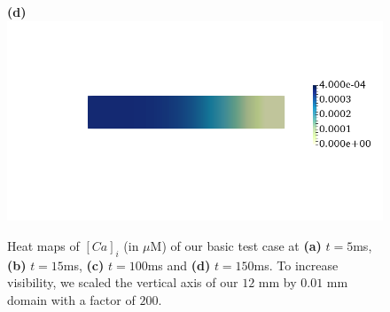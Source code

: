\documentclass[12pt,a4paper]{article}
\begin{document}
\begin{figure}
\begin{minipage}{0.47\textwidth}
  \textbf{(d)} \includegraphics[trim=0cm 4cm 0cm 4cm, clip=true, width=0.9\linewidth]{c150}
    \end{minipage}
    \caption{Heat maps of $[Ca]_i$ (in $\mu$M) of our basic test case at \textbf{(a)} $t=5$ms, \textbf{(b)} $t=15$ms, \textbf{(c)} $t=100$ms and \textbf{(d)} $t=150$ms. To increase visibility, we scaled the vertical axis of our $12$ mm by $0.01$ mm domain with a factor of $200$.}
    \label{fig:2}
\end{figure}
%
\end{document}
